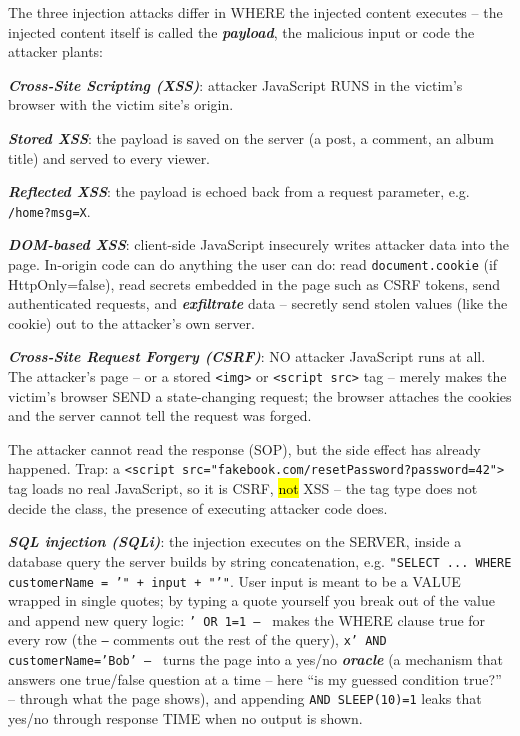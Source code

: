 \documentclass[12pt, a4paper]{article}
\newcommand{\term}[1]{\textbf{\textit{#1}}}        %
\newcommand{\imp}[1]{\hl{#1}}                       %
\begin{document}
The three injection attacks differ in WHERE the injected content executes -- the injected content itself is called the \term{payload}, the malicious input or code the attacker plants:
\begin{tightitem}
    \item \term{Cross-Site Scripting (XSS)}: attacker JavaScript RUNS in the victim's browser with the victim site's origin.

    \term{Stored XSS}: the payload is saved on the server (a post, a comment, an album title) and served to every viewer.

    \term{Reflected XSS}: the payload is echoed back from a request parameter, e.g. \texttt{/home?msg=X}.

    \term{DOM-based XSS}: client-side JavaScript insecurely writes attacker data into the page. In-origin code can do anything the user can do: read \texttt{document.cookie} (if HttpOnly=false), read secrets embedded in the page such as CSRF tokens, send authenticated requests, and \term{exfiltrate} data -- secretly send stolen values (like the cookie) out to the attacker's own server.
    \item \term{Cross-Site Request Forgery (CSRF)}: NO attacker JavaScript runs at all. The attacker's page -- or a stored \texttt{<img>} or \texttt{<script src>} tag -- merely makes the victim's browser SEND a state-changing request; the browser attaches the cookies and the server cannot tell the request was forged.

    The attacker cannot read the response (SOP), but the side effect has already happened. Trap: a \texttt{<script src="fakebook.com/resetPassword?password=42">} tag loads no real JavaScript, so it is CSRF, \imp{not} XSS -- the tag type does not decide the class, the presence of executing attacker code does.
    \item \term{SQL injection (SQLi)}: the injection executes on the SERVER, inside a database query the server builds by string concatenation, e.g.
    \texttt{"SELECT ... WHERE customerName = '" + input + "'"}. User input is meant to be a VALUE wrapped in single quotes; by typing a quote yourself you break out of the value and append new query logic: \texttt{' OR 1=1 -- } makes the WHERE clause true for every row (the \texttt{--} comments out the rest of the query), \texttt{x' AND customerName='Bob' -- } turns the page into a yes/no \term{oracle} (a mechanism that answers one true/false question at a time -- here ``is my guessed condition true?'' -- through what the page shows), and appending \texttt{AND SLEEP(10)=1} leaks that yes/no through response TIME when no output is shown.
\end{tightitem}
\end{document}
